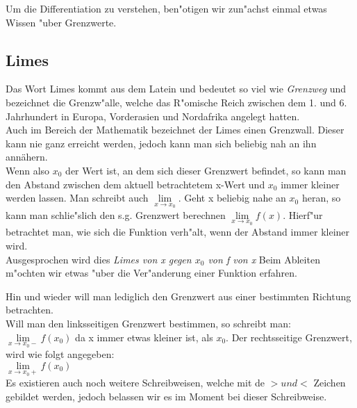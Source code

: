 Um die Differentiation zu verstehen, ben"otigen wir zun"achst einmal etwas Wissen "uber Grenzwerte.

\subsection{Limes}
Das Wort Limes kommt aus dem Latein und bedeutet so viel wie \textit{Grenzweg} und bezeichnet die Grenzw"alle, welche das R"omische Reich zwischen dem 1. und 6. Jahrhundert in Europa, Vorderasien und Nordafrika angelegt hatten.\\
Auch im Bereich der Mathematik bezeichnet der Limes einen Grenzwall. Dieser kann nie ganz erreicht werden, jedoch kann man sich beliebig nah an ihn annähern.\\
Wenn also $x_0$ der Wert ist, an dem sich dieser Grenzwert befindet, so kann man den Abstand zwischen dem aktuell betrachtetem x-Wert und $x_0$ immer kleiner werden lassen. Man schreibt auch $\lim\limits_{x \to x_0}$. Geht x beliebig nahe an $x_0$ heran, so kann man schlie"slich den s.g. Grenzwert berechnen $\lim\limits_{x \to x_0} f(x)$. Hierf"ur betrachtet man, wie sich die Funktion verh"alt, wenn der Abstand immer kleiner wird.\\
Ausgesprochen wird dies \textit{Limes von x gegen $x_0$ von f von x}
Beim Ableiten m"ochten wir etwas "uber die Ver"anderung einer Funktion erfahren.

\begin{warning}
	Hin und wieder will man lediglich den Grenzwert aus einer bestimmten Richtung betrachten.\\
	Will man den linksseitigen Grenzwert bestimmen, so schreibt man:\\
	$\lim\limits_{x \to x_0-} f(x_0)$ da x immer etwas kleiner ist, als $x_0$.
	Der rechtsseitige Grenzwert, wird wie folgt angegeben:\\
	$\lim\limits_{x \to x_0+} f(x_0)$\\
	Es existieren auch noch weitere Schreibweisen, welche mit de $> und <$ Zeichen gebildet werden, jedoch belassen wir es im Moment bei dieser Schreibweise.
\end{warning}

